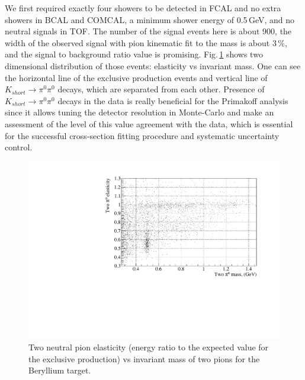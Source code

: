 We first required exactly four showers to be detected in FCAL and no
extra showers in BCAL and COMCAL, a minimum shower energy of
0.5$\,$GeV, and no neutral signals in TOF. The number of the signal
events here is about 900, the width of the observed signal with pion
kinematic fit to the mass is about 3$\,$\%, and the signal to
background ratio value is promising. Fig.$\,$\ref{fig:2dbe} shows two
dimensional distribution of those events: elasticity vs invariant
mass. One can see the horizontal line of the exclusive production
events and vertical line of $K_{short}\to\pi^0\pi^0$ decays, which are
separated from each other. Presence of $K_{short}\to\pi^0\pi^0$ decays
in the data is really beneficial for the Primakoff analysis since it
allows tuning the detector resolution in Monte-Carlo and make an
assessment of the level of this value agreement with the data, which
is essential for the successful cross-section fitting procedure and
systematic uncertainty control.
\begin{figure}[!h]
\centering\includegraphics[width=4.75in]{figures/2d_be.pdf}
\caption{Two neutral pion elasticity (energy ratio to the expected value for the exclusive production) vs invariant mass of two pions for the Beryllium target.
\label{fig:2dbe}}
\end{figure}

